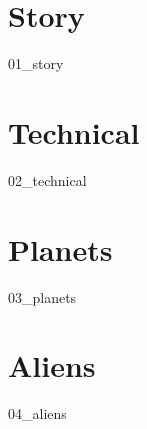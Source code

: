 \chapter{Story}
{01_story}

\chapter{Technical}
{02_technical}

\chapter{Planets}
{03_planets}

\chapter{Aliens}
{04_aliens}